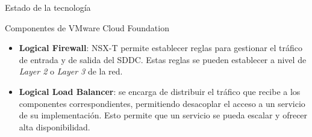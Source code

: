\begin{section}{Estado de la tecnología}
\begin{subsection}{Componentes de VMware Cloud Foundation \cite{componentesCloudFound}}
\begin{itemize}
\begin{itemize}
\begin{itemize}
        \item \textbf{Logical Firewall}: NSX-T permite establecer reglas para gestionar el tráfico de entrada y de salida del SDDC. Estas reglas se pueden establecer a nivel de \textit{Layer 2} o \textit{Layer 3} de la red.
        \item \textbf{Logical Load Balancer}: se encarga de distribuir el tráfico que recibe a los componentes correspondientes, permitiendo desacoplar el acceso a un servicio de su implementación. Esto permite que un servicio se pueda escalar y ofrecer alta disponibilidad.
    \end{itemize}
        
\FloatBarrier

\end{itemize}
\end{itemize}
\end{subsection}
\end{section}
